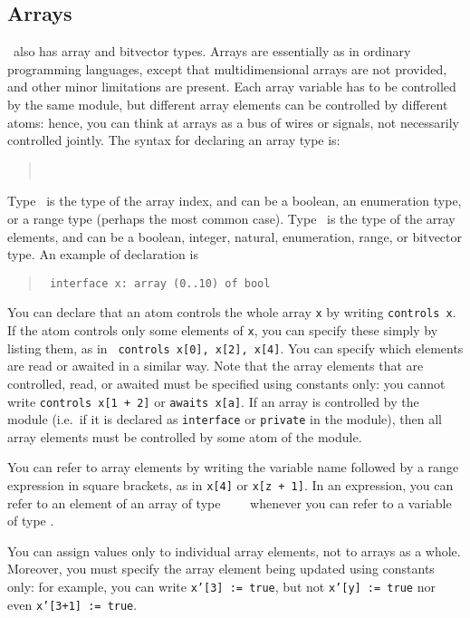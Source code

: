 
\subsection{Arrays}

\mocha\ also has array and
bitvector types.  Arrays are
essentially as in ordinary programming languages, except that
multidimensional arrays are not provided, and other minor limitations
are present.  Each array variable has to be controlled by the same
module, but different array elements can be controlled by different
atoms: hence, you can think at arrays as a bus of wires or signals,
not necessarily controlled jointly. 
The syntax for declaring an array type is: 
%
\begin{quote} 
  \ARRAY\ \indextype\ \OF\ \elementtype
\end{quote}
%
Type \indextype\ is the type of the array index, and can be a boolean,
an enumeration type, or a range type (perhaps the most common case).
Type \elementtype\ is the type of the array elements, and can be a
boolean, integer, natural, enumeration, range, or bitvector type.
An example of declaration is 
%
\begin{quote} \tt
  interface x: array (0..10) of bool
\end{quote}
%
You can declare that an atom controls the whole array {\tt x} by
writing {\tt controls x}.  If the atom controls only some elements of
{\tt x}, you can specify these simply by listing them, as in {\tt
controls x[0], x[2], x[4]}.  You can specify which elements are read
or awaited in a similar way. 
Note that the array elements that are controlled, read, or awaited
must be specified using constants only: you cannot write {\tt controls
x[1 + 2]} or {\tt awaits x[a]}. 
If an array is controlled by the module (i.e.\ if it is declared as
{\tt interface} or {\tt private} in the module), then all array
elements must be controlled by some atom of the module.

You can refer to array elements by writing the variable name followed
by a range expression in square brackets, as in {\tt x[4]} or {\tt x[z
+ 1]}.  In an expression, you can refer to an element of an array of
type \ARRAY\ \indextype\ \OF\ \elementtype\ whenever you can refer to
a variable of type \elementtype.

You can assign values only to individual array elements, not to arrays
as a whole.  Moreover, you must specify the array element being
updated using constants only: for example, you can write {\tt x'[3] :=
true}, but not {\tt x'[y] := true} nor even {\tt x'[3+1] := true}.

